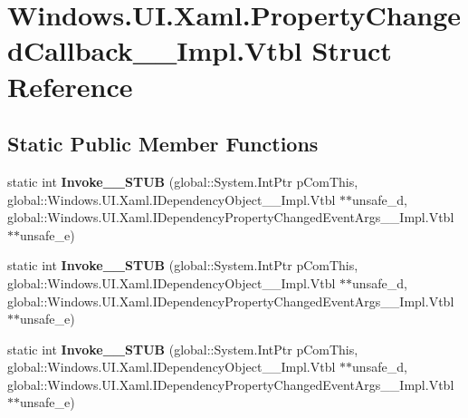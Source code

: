 \hypertarget{struct_windows_1_1_u_i_1_1_xaml_1_1_property_changed_callback_____impl_1_1_vtbl}{}\section{Windows.\+U\+I.\+Xaml.\+Property\+Changed\+Callback\+\_\+\+\_\+\+Impl.\+Vtbl Struct Reference}
\label{struct_windows_1_1_u_i_1_1_xaml_1_1_property_changed_callback_____impl_1_1_vtbl}
\subsection*{Static Public Member Functions}
\begin{DoxyCompactItemize}
\item 
\mbox{\label{struct_windows_1_1_u_i_1_1_xaml_1_1_property_changed_callback_____impl_1_1_vtbl_ae038e1ac1a4dfb3ad283674a8247ba70}} 
static int {\bfseries Invoke\+\_\+\+\_\+\+S\+T\+UB} (global\+::\+System.\+Int\+Ptr p\+Com\+This, global\+::\+Windows.\+U\+I.\+Xaml.\+I\+Dependency\+Object\+\_\+\+\_\+\+Impl.\+Vtbl $\ast$$\ast$unsafe\+\_\+d, global\+::\+Windows.\+U\+I.\+Xaml.\+I\+Dependency\+Property\+Changed\+Event\+Args\+\_\+\+\_\+\+Impl.\+Vtbl $\ast$$\ast$unsafe\+\_\+e)
\item 
\mbox{\label{struct_windows_1_1_u_i_1_1_xaml_1_1_property_changed_callback_____impl_1_1_vtbl_ae038e1ac1a4dfb3ad283674a8247ba70}} 
static int {\bfseries Invoke\+\_\+\+\_\+\+S\+T\+UB} (global\+::\+System.\+Int\+Ptr p\+Com\+This, global\+::\+Windows.\+U\+I.\+Xaml.\+I\+Dependency\+Object\+\_\+\+\_\+\+Impl.\+Vtbl $\ast$$\ast$unsafe\+\_\+d, global\+::\+Windows.\+U\+I.\+Xaml.\+I\+Dependency\+Property\+Changed\+Event\+Args\+\_\+\+\_\+\+Impl.\+Vtbl $\ast$$\ast$unsafe\+\_\+e)
\item 
\mbox{\label{struct_windows_1_1_u_i_1_1_xaml_1_1_property_changed_callback_____impl_1_1_vtbl_ae038e1ac1a4dfb3ad283674a8247ba70}} 
static int {\bfseries Invoke\+\_\+\+\_\+\+S\+T\+UB} (global\+::\+System.\+Int\+Ptr p\+Com\+This, global\+::\+Windows.\+U\+I.\+Xaml.\+I\+Dependency\+Object\+\_\+\+\_\+\+Impl.\+Vtbl $\ast$$\ast$unsafe\+\_\+d, global\+::\+Windows.\+U\+I.\+Xaml.\+I\+Dependency\+Property\+Changed\+Event\+Args\+\_\+\+\_\+\+Impl.\+Vtbl $\ast$$\ast$unsafe\+\_\+e)

\end{DoxyCompactItemize}
